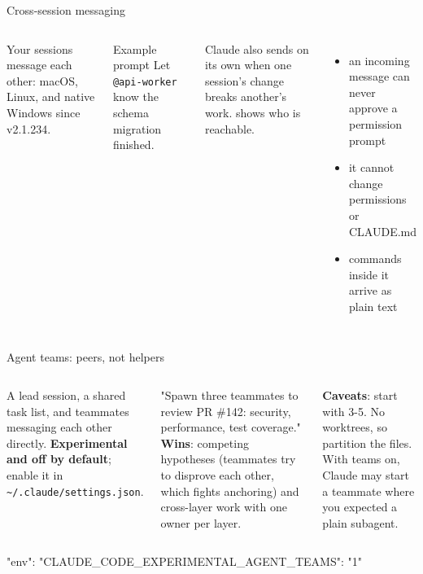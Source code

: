 \documentclass[aspectratio=169,11pt,t]{beamer}
\begin{document}
\begin{frame}{Cross-session messaging}
  \begin{columns}[T,onlytextwidth]
      Your sessions message each other: macOS, Linux, and native Windows since v2.1.234.\par\vspace{0.5em}
      \begin{callout}[good]{Example prompt}
        Let \texttt{@api-worker} know the schema migration finished.
      \end{callout}
      \small Claude also sends on its own when one session's change breaks another's work.  shows who is reachable.
      \par\vspace{0.35em}
      \begin{itemize}\small\setlength\itemsep{0.3em}
        \item an incoming message can never approve a permission prompt
        \item it cannot change permissions or CLAUDE.md
        \item commands inside it arrive as plain text
      \end{itemize}
  \end{columns}
\end{frame}

\begin{frame}[fragile]{Agent teams: peers, not helpers}
  \begin{columns}[T,onlytextwidth]
      \small A lead session, a shared task list, and teammates messaging each other directly. \textbf{Experimental and off by default}; enable it in \texttt{\textasciitilde/.claude/settings.json}.\par\vspace{0.4em}
      \footnotesize\color{muted}"Spawn three teammates to review PR \#142: security, performance, test coverage."
      \small
      \textbf{Wins}: competing hypotheses (teammates try to disprove each other, which fights anchoring) and cross-layer work with one owner per layer.\par\vspace{0.4em}
      \textbf{Caveats}: start with 3-5. No worktrees, so partition the files. With teams on, Claude may start a teammate where you expected a plain subagent.
  \end{columns}\par\vspace{0.6em}
\begin{code}[]
{ "env": { "CLAUDE_CODE_EXPERIMENTAL_AGENT_TEAMS": "1" } }
\end{code}
\end{frame}
\end{document}
